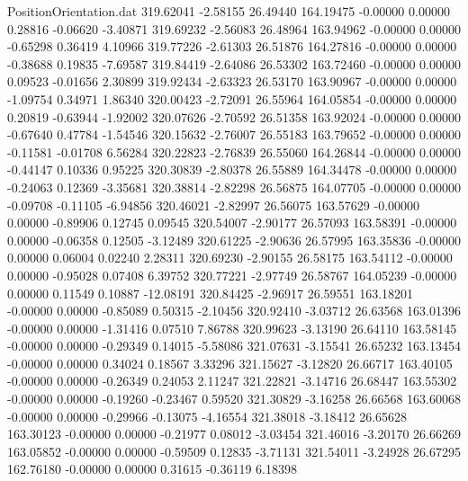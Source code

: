 \begin{filecontents}{PositionOrientation.dat}
 319.62041   -2.58155   26.49440   164.19475   -0.00000    0.00000    0.28816   -0.06620   -3.40871
 319.69232   -2.56083   26.48964   163.94962   -0.00000    0.00000   -0.65298    0.36419    4.10966
 319.77226   -2.61303   26.51876   164.27816   -0.00000    0.00000   -0.38688    0.19835   -7.69587
 319.84419   -2.64086   26.53302   163.72460   -0.00000    0.00000    0.09523   -0.01656    2.30899
 319.92434   -2.63323   26.53170   163.90967   -0.00000    0.00000   -1.09754    0.34971    1.86340
 320.00423   -2.72091   26.55964   164.05854   -0.00000    0.00000    0.20819   -0.63944   -1.92002
 320.07626   -2.70592   26.51358   163.92024   -0.00000    0.00000   -0.67640    0.47784   -1.54546
 320.15632   -2.76007   26.55183   163.79652   -0.00000    0.00000   -0.11581   -0.01708    6.56284
 320.22823   -2.76839   26.55060   164.26844   -0.00000    0.00000   -0.44147    0.10336    0.95225
 320.30839   -2.80378   26.55889   164.34478   -0.00000    0.00000   -0.24063    0.12369   -3.35681
 320.38814   -2.82298   26.56875   164.07705   -0.00000    0.00000   -0.09708   -0.11105   -6.94856
 320.46021   -2.82997   26.56075   163.57629   -0.00000    0.00000   -0.89906    0.12745    0.09545
 320.54007   -2.90177   26.57093   163.58391   -0.00000    0.00000   -0.06358    0.12505   -3.12489
 320.61225   -2.90636   26.57995   163.35836   -0.00000    0.00000    0.06004    0.02240    2.28311
 320.69230   -2.90155   26.58175   163.54112   -0.00000    0.00000   -0.95028    0.07408    6.39752
 320.77221   -2.97749   26.58767   164.05239   -0.00000    0.00000    0.11549    0.10887  -12.08191
 320.84425   -2.96917   26.59551   163.18201   -0.00000    0.00000   -0.85089    0.50315   -2.10456
 320.92410   -3.03712   26.63568   163.01396   -0.00000    0.00000   -1.31416    0.07510    7.86788
 320.99623   -3.13190   26.64110   163.58145   -0.00000    0.00000   -0.29349    0.14015   -5.58086
 321.07631   -3.15541   26.65232   163.13454   -0.00000    0.00000    0.34024    0.18567    3.33296
 321.15627   -3.12820   26.66717   163.40105   -0.00000    0.00000   -0.26349    0.24053    2.11247
 321.22821   -3.14716   26.68447   163.55302   -0.00000    0.00000   -0.19260   -0.23467    0.59520
 321.30829   -3.16258   26.66568   163.60068   -0.00000    0.00000   -0.29966   -0.13075   -4.16554
 321.38018   -3.18412   26.65628   163.30123   -0.00000    0.00000   -0.21977    0.08012   -3.03454
 321.46016   -3.20170   26.66269   163.05852   -0.00000    0.00000   -0.59509    0.12835   -3.71131
 321.54011   -3.24928   26.67295   162.76180   -0.00000    0.00000    0.31615   -0.36119    6.18398

\end{filecontents}
